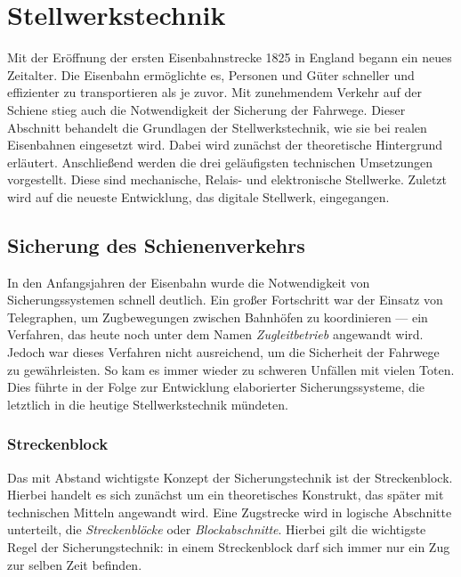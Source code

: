 \section{Stellwerkstechnik}\label{text:Grundlagen:Stellwerkstechnik}

Mit der Eröffnung der ersten Eisenbahnstrecke 1825 in England begann ein neues Zeitalter. Die Eisenbahn ermöglichte es, Personen und Güter schneller und effizienter zu transportieren als je zuvor. Mit zunehmendem Verkehr auf der Schiene stieg auch die Notwendigkeit der Sicherung der Fahrwege. Dieser Abschnitt behandelt die Grundlagen der Stellwerkstechnik, wie sie bei realen Eisenbahnen eingesetzt wird. Dabei wird zunächst der theoretische Hintergrund erläutert. Anschließend werden die drei geläufigsten technischen Umsetzungen vorgestellt. Diese sind mechanische, Relais- und elektronische Stellwerke. Zuletzt wird auf die neueste Entwicklung, das digitale Stellwerk, eingegangen.

\subsection{Sicherung des Schienenverkehrs}\label{text:Grundlagen:Stellwerkstechnik:Sicherung-des-Schienenverkehrs}

In den Anfangsjahren der Eisenbahn wurde die Notwendigkeit von Sicherungssystemen schnell deutlich. Ein großer Fortschritt war der Einsatz von Telegraphen, um Zugbewegungen zwischen Bahnhöfen zu koordinieren --- ein Verfahren, das heute noch unter dem Namen \textit{Zugleitbetrieb} angewandt wird. Jedoch war dieses Verfahren nicht ausreichend, um die Sicherheit der Fahrwege zu gewährleisten. So kam es immer wieder zu schweren Unfällen mit vielen Toten. Dies führte in der Folge zur Entwicklung elaborierter Sicherungssysteme, die letztlich in die heutige Stellwerkstechnik mündeten.

\subsubsection*{Streckenblock}\label{text:Grundlagen:Stellwerkstechnik:Sicherung-des-Schienenverkehrs:Streckenblock}

Das mit Abstand wichtigste Konzept der Sicherungstechnik ist der Streckenblock. Hierbei handelt es sich zunächst um ein theoretisches Konstrukt, das später mit technischen Mitteln angewandt wird. Eine Zugstrecke wird in logische Abschnitte unterteilt, die \textit{Streckenblöcke} oder \textit{Blockabschnitte}. Hierbei gilt die wichtigste Regel der Sicherungstechnik: in einem Streckenblock darf sich immer nur ein Zug zur selben Zeit befinden.


